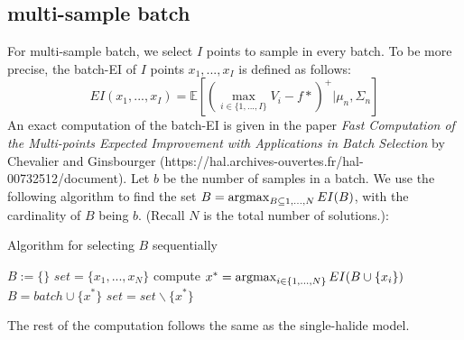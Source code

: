 \documentclass[11pt]{article}
\newcommand{\argmax}{\operatornamewithlimits{argmax}}
\begin{document}
\subsection{multi-sample batch}
For multi-sample batch, we select $I$ points to sample in every batch. To be more precise, the batch-EI of $I$ points $x_1,...,x_I$ is defined as follows:
\begin{equation}
EI(x_1,...,x_I) = \mathbb{E}\left[(\max_{i\in\{1,...,I\}} V_i - f*)^+\Big|\mu_n,\Sigma_n\right]
\end{equation} 
An exact computation of the batch-EI is given in the paper \textit{Fast Computation of the Multi-points Expected
Improvement with Applications in Batch Selection} by Chevalier and Ginsbourger (https://hal.archives-ouvertes.fr/hal-00732512/document).
Let $b$ be the number of samples in a batch. We use the following algorithm to find the set $B = \argmax_{B\subseteq {1,...,N}}EI(B)$, with the cardinality of $B$ being $b$. (Recall $N$ is the total number of solutions.):
\begin{algorithm}
\caption{Algorithm for selecting $B$ sequentially}
\label{ag:B}
\begin{algorithmic}
\STATE $B := \{ \}$
\STATE $set = \{x_1,...,x_N\}$
\STATE compute $x^* = \argmax_{i\in\{1,...,N\}}EI(B\cup\{x_i\})$
\STATE $B = batch \cup \{x^*\}$
\STATE $set = set\backslash \{x^*\}$
\ENDFOR
\end{algorithmic}
\end{algorithm}
The rest of the computation follows the same as the single-halide model.
\end{document}
